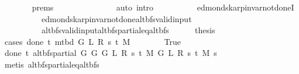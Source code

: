 \begin{isabellebody}
\ \ \ \ \ \ \isamarkupfalse%
\ {\isachardoublequoteopen}{}{\isachardot}{\kern0pt}prems{\isachardoublequoteclose}\isanewline
\ \ \ \ \ \ \isamarkupfalse%
\isanewline
\ \ \ \ \ \ \ \ {\isacharparenleft}{\kern0pt}auto\ intro{\isacharcolon}{\kern0pt}\isanewline
\ \ \ \ \ \ \ \ \ \ edmonds{\isacharunderscore}{\kern0pt}karp{\isacharunderscore}{\kern0pt}invar{\isacharunderscore}{\kern0pt}not{\isacharunderscore}{\kern0pt}done{\isacharunderscore}{\kern0pt}{}I\isanewline
\ \ \ \ \ \ \ \ \ \ edmonds{\isacharunderscore}{\kern0pt}karp{\isacharunderscore}{\kern0pt}invar{\isacharunderscore}{\kern0pt}not{\isacharunderscore}{\kern0pt}done{\isacharunderscore}{\kern0pt}{}{\isachardot}{\kern0pt}alt{\isacharunderscore}{\kern0pt}bfs{\isacharunderscore}{\kern0pt}valid{\isacharunderscore}{\kern0pt}input\isanewline
\ \ \ \ \ \ \ \ \ \ alt{\isacharunderscore}{\kern0pt}bfs{\isacharunderscore}{\kern0pt}valid{\isacharunderscore}{\kern0pt}input{\isachardot}{\kern0pt}alt{\isacharunderscore}{\kern0pt}bfs{\isacharunderscore}{\kern0pt}partial{\isacharunderscore}{\kern0pt}eq{\isacharunderscore}{\kern0pt}alt{\isacharunderscore}{\kern0pt}bfs{\isacharparenright}{\kern0pt}\isanewline
\ \ \ \ \isamarkupfalse%
\ {\isacharquery}{\kern0pt}thesis\isanewline
\ \ \ \ \isamarkupfalse%
\ {\isacharparenleft}{\kern0pt}cases\ {\isachardoublequoteopen}done{\isacharunderscore}{\kern0pt}{}\ t\ {\isacharparenleft}{\kern0pt}m{\isacharunderscore}{\kern0pt}tbd\ G\ L\ R\ s\ t\ M{\isacharparenright}{\kern0pt}{\isachardoublequoteclose}{\isacharparenright}{\kern0pt}\isanewline
\ \ \ \ \ \ \isamarkupfalse%
\ True\isanewline
\ \ \ \ \ \ \isamarkupfalse%
\ {\isachardoublequoteopen}done{\isacharunderscore}{\kern0pt}{}\ t\ {\isacharparenleft}{\kern0pt}alt{\isacharunderscore}{\kern0pt}bfs{\isacharunderscore}{\kern0pt}partial\ {\isacharparenleft}{\kern0pt}G{}\ G\ {\isacharparenleft}{\kern0pt}G{}\ L\ R\ s\ t\ M{\isacharparenright}{\kern0pt}{\isacharparenright}{\kern0pt}\ {\isacharparenleft}{\kern0pt}G{}\ L\ R\ s\ t\ M{\isacharparenright}{\kern0pt}\ s{\isacharparenright}{\kern0pt}{\isachardoublequoteclose}\isanewline
\ \ \ \ \ \ \ \ \isamarkupfalse%
\ {\isacharparenleft}{\kern0pt}metis\ alt{\isacharunderscore}{\kern0pt}bfs{\isacharunderscore}{\kern0pt}partial{\isacharunderscore}{\kern0pt}eq{\isacharunderscore}{\kern0pt}alt{\isacharunderscore}{\kern0pt}bfs{\isacharparenright}{\kern0pt}\isanewline
\ \ \ \ \ \ \isamarkupfalse%

\end{isabellebody}
